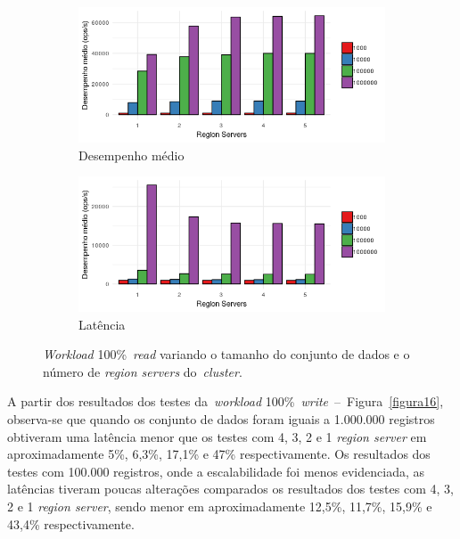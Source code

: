 \documentclass[12pt]{article}
\begin{document}
\begin{figure}[!ht]
    \centering
    \begin{subfigure}[b]{0.49\textwidth}
        \centering
        \includegraphics[width=\textwidth]{images/figura17}
        \caption{Desempenho médio}
        \label{figura17}
    \end{subfigure}
        \hfill
    \begin{subfigure}[b]{0.49\textwidth}  
        \centering 
        \includegraphics[width=\textwidth]{images/figura18}
        \caption{Latência}%
        \label{figura18}
    \end{subfigure}
    \caption{\emph{Workload} 100\%~\emph{read} variando o tamanho do conjunto de dados e o número de \emph{region servers} do~\emph{cluster}.}
\end{figure}

A partir dos resultados dos testes da~\emph{workload} 100\%~\emph{write}~--~Figura~\ref{figura16}, observa-se que quando os conjunto de dados foram iguais a 1.000.000 registros obtiveram uma latência menor que os testes com 4, 3, 2 e 1 \emph{region server} em aproximadamente 5\%, 6,3\%, 17,1\% e 47\% respectivamente. Os resultados dos testes com 100.000 registros, onde a escalabilidade foi menos evidenciada, as latências tiveram poucas alterações comparados os resultados dos testes com 4, 3, 2 e 1 \emph{region server}, sendo menor em aproximadamente 12,5\%, 11,7\%, 15,9\% e 43,4\% respectivamente.
\end{document}
